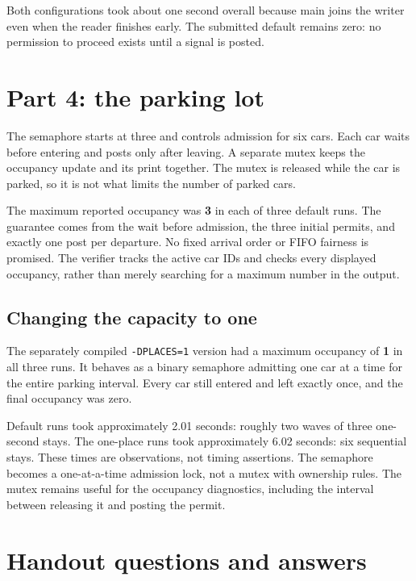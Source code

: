 \documentclass[12pt]{article}
\begin{document}
Both configurations took about one second overall because main joins the
writer even when the reader finishes early. The submitted default remains
zero: no permission to proceed exists until a signal is posted.

\clearpage
\section{Part 4: the parking lot}
The semaphore starts at three and controls admission for six cars. Each car
waits before entering and posts only after leaving. A separate mutex keeps
the occupancy update and its print together. The mutex is released while
the car is parked, so it is not what limits the number of parked cars.

The maximum reported occupancy was \textbf{3} in each of three default runs.
The guarantee comes from the wait before admission, the three initial
permits, and exactly one post per departure. No fixed arrival order or
FIFO fairness is promised. The verifier tracks the active car IDs and
checks every displayed occupancy, rather than merely searching for a
maximum number in the output.

\subsection{Changing the capacity to one}
The separately compiled \texttt{-DPLACES=1} version had a maximum occupancy
of \textbf{1} in all three runs. It behaves as a binary semaphore admitting
one car at a time for the entire parking interval. Every car still entered
and left exactly once, and the final occupancy was zero.

Default runs took approximately 2.01 seconds: roughly two waves of three
one-second stays. The one-place runs took approximately 6.02 seconds:
six sequential stays. These times are observations, not timing assertions.
The semaphore becomes a one-at-a-time admission lock, not a mutex with
ownership rules. The mutex remains useful for the occupancy diagnostics,
including the interval between releasing it and posting the permit.

\clearpage
\section{Handout questions and answers}
\end{document}
